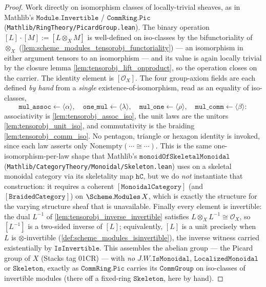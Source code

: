 \begin{proof}
  \leanok
  Work directly on isomorphism classes of locally-trivial sheaves, as in Mathlib's
  \(\mathtt{Module.Invertible}\) / \(\mathtt{CommRing.Pic}\)
  (\texttt{Mathlib/RingTheory/PicardGroup.lean}). The binary operation
  \([L]\cdot[M] := [L \otimes_X M]\) is well-defined on iso-classes by the
  bifunctoriality of \(\otimes_X\)
  (\cref{lem:scheme_modules_tensorobj_functoriality}) --- an isomorphism in either
  argument tensors to an isomorphism --- and its value is again locally trivial by
  the closure lemma \cref{lem:tensorobj_lift_onproduct}, so the operation closes on
  the carrier. The identity element is \([\mathcal{O}_X]\). The four group-axiom
  fields are each defined \emph{by hand} from a \emph{single} existence-of-isomorphism,
  read as an equality of iso-classes,
  \[
    \mathtt{mul\_assoc} \leftarrow \langle\alpha\rangle,
    \quad
    \mathtt{one\_mul} \leftarrow \langle\lambda\rangle,
    \quad
    \mathtt{mul\_one} \leftarrow \langle\rho\rangle,
    \quad
    \mathtt{mul\_comm} \leftarrow \langle\beta\rangle:
  \]
  associativity is \cref{lem:tensorobj_assoc_iso}, the unit laws are the unitors
  \cref{lem:tensorobj_unit_iso}, and commutativity is the braiding
  \cref{lem:tensorobj_comm_iso}. No pentagon, triangle or hexagon identity is
  invoked, since each law asserts only \(\mathrm{Nonempty}(\cdots \cong \cdots)\).
  This is the same one-isomorphism-per-law shape that Mathlib's
  \(\mathtt{monoidOfSkeletalMonoidal}\)
  (\texttt{Mathlib/CategoryTheory/Monoidal/Skeleton.lean}) uses on a skeletal
  monoidal category via its skeletality map \(\mathtt{hC}\), but we do \emph{not}
  instantiate that construction: it requires a coherent \([\mathtt{MonoidalCategory}]\)
  (and \([\mathtt{BraidedCategory}]\)) on \(\Scheme.\mathtt{Modules}\,X\), which is
  exactly the structure for the varying structure sheaf that is unavailable.
  Finally every element is invertible: the dual \(L^{-1}\) of
  \cref{lem:tensorobj_inverse_invertible} satisfies \(L \otimes_X L^{-1} \cong
  \mathcal{O}_X\), so \([L^{-1}]\) is a two-sided inverse of \([L]\); equivalently,
  \([L]\) is a unit precisely when \(L\) is \(\otimes\)-invertible
  (\cref{def:scheme_modules_isinvertible}), the inverse witness carried
  existentially by \(\mathtt{IsInvertible}\). This assembles the abelian group ---
  the Picard group of \(X\) (Stacks tag 01CR) --- with \emph{no}
  \(J.W.\mathtt{IsMonoidal}\), \(\mathtt{LocalizedMonoidal}\) or \(\mathtt{Skeleton}\),
  exactly as \(\mathtt{CommRing.Pic}\) carries its \(\mathtt{CommGroup}\) on
  iso-classes of invertible modules (there off a fixed-ring \(\mathtt{Skeleton}\),
  here by hand).


\end{proof}
